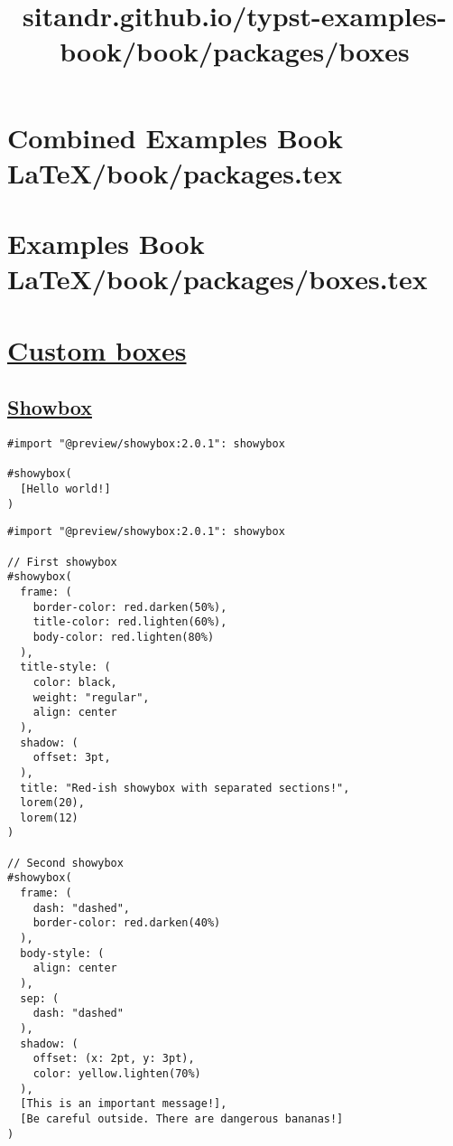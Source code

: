 \pandocbounded{}




\section{Combined Examples Book LaTeX/book/packages.tex}
\section{Examples Book LaTeX/book/packages/boxes.tex}
\title{sitandr.github.io/typst-examples-book/book/packages/boxes}

\section{\texorpdfstring{\hyperref[custom-boxes]{Custom
boxes}}{Custom boxes}}\label{custom-boxes}

\subsection{\texorpdfstring{\hyperref[showbox]{Showbox}}{Showbox}}\label{showbox}

\begin{verbatim}
#import "@preview/showybox:2.0.1": showybox

#showybox(
  [Hello world!]
)
\end{verbatim}

\pandocbounded{}

\begin{verbatim}
#import "@preview/showybox:2.0.1": showybox

// First showybox
#showybox(
  frame: (
    border-color: red.darken(50%),
    title-color: red.lighten(60%),
    body-color: red.lighten(80%)
  ),
  title-style: (
    color: black,
    weight: "regular",
    align: center
  ),
  shadow: (
    offset: 3pt,
  ),
  title: "Red-ish showybox with separated sections!",
  lorem(20),
  lorem(12)
)

// Second showybox
#showybox(
  frame: (
    dash: "dashed",
    border-color: red.darken(40%)
  ),
  body-style: (
    align: center
  ),
  sep: (
    dash: "dashed"
  ),
  shadow: (
    offset: (x: 2pt, y: 3pt),
    color: yellow.lighten(70%)
  ),
  [This is an important message!],
  [Be careful outside. There are dangerous bananas!]
)
\end{verbatim}

